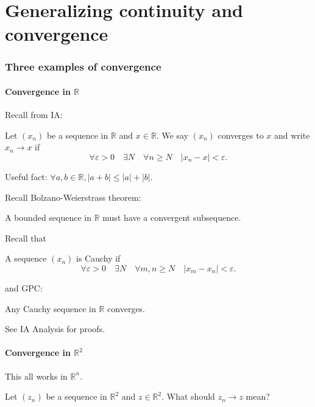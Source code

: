 \documentclass[a4paper]{article}
\renewcommand{\epsilon}{\varepsilon}
\begin{document}
\maketitle
\tableofcontents

\part{Generalizing continuity and convergence}
\section{Three examples of convergence}
\subsection{Convergence in $\mathbb{R}$}
Recall from IA: 
\begin{definition}
    Let $(x_n)$ be a sequence in $\mathbb{R}$ and $x\in \mathbb{R}$. We say $(x_n)$ converges to $x$ and write $x_n\to x$ if 
    \[
        \forall \epsilon>0\quad \exists N\quad \forall n\ge N\quad |x_n-x|<\epsilon.
    \]
\end{definition}

Useful fact: $ \forall a,b\in \mathbb{R}, |a+b|\le |a|+|b| $. 

Recall Bolzano-Weierstrass theorem:
\begin{theorem}[BWT]
    A bounded sequence in $\mathbb{R}$ must have a convergent subsequence. 
\end{theorem}

Recall that 
\begin{definition}
    A sequence $(x_n)$ is Cauchy if 
    \[
        \forall \epsilon>0\quad \exists N\quad \forall m,n\ge N\quad |x_m-x_n| < \epsilon. 
    \]
\end{definition}
and GPC: 
\begin{theorem}
    Any Cauchy sequence in $\mathbb{R}$ converges. 
\end{theorem}
See IA Analysis for proofs. 

\subsection{Convergence in $ \mathbb{R}^{2} $}
\begin{remark}
    This all works in $ \mathbb{R}^{n} $. 
\end{remark}
Let $(z_n)$ be a sequence in $ \mathbb{R}^{2} $ and $z\in \mathbb{R}^{2}$. What should $z_n\to z$ mean? 
\end{document}
